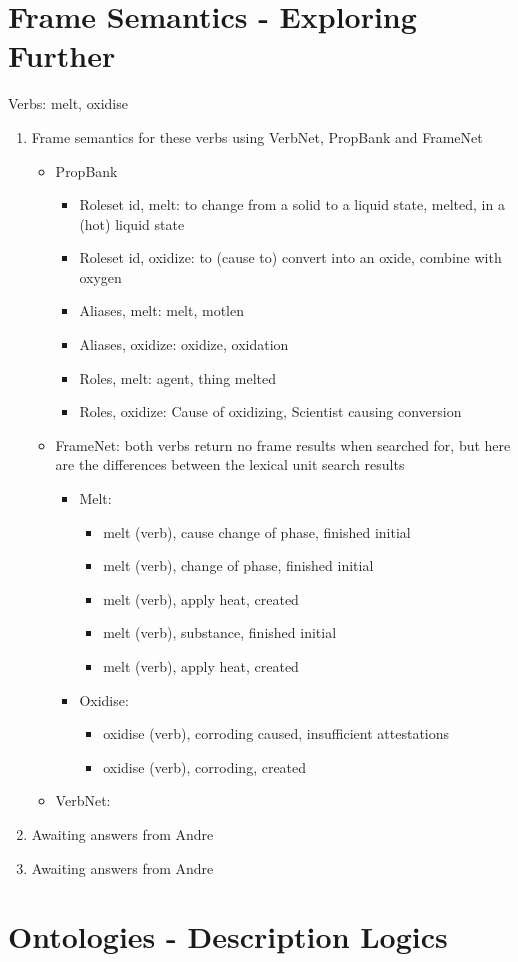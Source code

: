 \documentclass[12pt]{report}
\begin{document}
\section{Frame Semantics - Exploring Further}
Verbs: melt, oxidise
\begin{enumerate}
  \item Frame semantics for these verbs using VerbNet, PropBank and FrameNet
  \begin{itemize}
    \item PropBank
    \begin{itemize}
      \item Roleset id, melt: to change from a solid to a liquid state, melted,
      in a (hot) liquid state
      \item Roleset id, oxidize: to (cause to) convert into an oxide, combine
      with oxygen
      \item Aliases, melt: melt, motlen
      \item Aliases, oxidize: oxidize, oxidation
      \item Roles, melt: agent, thing melted
      \item Roles, oxidize: Cause of oxidizing, Scientist causing conversion
    \end{itemize}
    \item FrameNet: both verbs return no frame results when searched for, but
    here are the differences between the lexical unit search results
    \begin{itemize}
      \item Melt:
      \begin{itemize}
        \item melt (verb), cause change of phase, finished initial
        \item melt (verb), change of phase, finished initial
        \item melt (verb), apply heat, created
        \item melt (verb), substance, finished initial
        \item melt (verb), apply heat, created
      \end{itemize}
      \item Oxidise:
      \begin{itemize}
        \item oxidise (verb), corroding caused, insufficient attestations
        \item oxidise (verb), corroding, created
      \end{itemize}
    \end{itemize}
    \item VerbNet:
  \end{itemize}
  \item Awaiting answers from Andre
  \item Awaiting answers from Andre
\end{enumerate}

\section{Ontologies - Description Logics}
\end{document}
